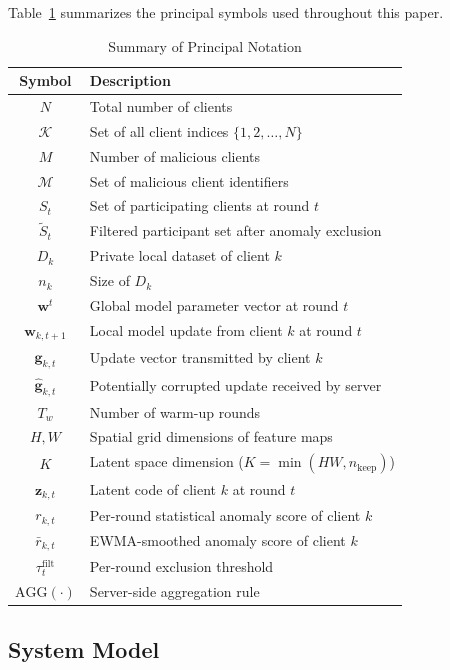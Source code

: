 \documentclass[journal]{IEEEtran}
\begin{document}
Table~\ref{tab:notation} summarizes the principal symbols used throughout this paper.

\begin{table}[t]
\centering
\caption{Summary of Principal Notation}
\label{tab:notation}
\begin{tabular}{@{}cl@{}}
\toprule
\textbf{Symbol} & \textbf{Description} \\
\midrule
$N$ & Total number of clients \\
$\mathcal{K}$ & Set of all client indices $\{1, 2, \ldots, N\}$ \\
$M$ & Number of malicious clients \\
$\mathcal{M}$ & Set of malicious client identifiers \\
$S_t$ & Set of participating clients at round $t$ \\
$\tilde{S}_t$ & Filtered participant set after anomaly exclusion \\
$D_k$ & Private local dataset of client $k$ \\
$n_k$ & Size of $D_k$ \\
$\mathbf{w}^t$ & Global model parameter vector at round $t$ \\
$\mathbf{w}_{k,t+1}$ & Local model update from client $k$ at round $t$ \\
$\mathbf{g}_{k,t}$ & Update vector transmitted by client $k$ \\
$\hat{\mathbf{g}}_{k,t}$ & Potentially corrupted update received by server \\
$T_w$ & Number of warm-up rounds \\
$H, W$ & Spatial grid dimensions of feature maps \\
$K$ & Latent space dimension ($K = \min(HW, n_{\mathrm{keep}})$) \\
$\mathbf{z}_{k,t}$ & Latent code of client $k$ at round $t$ \\
$r_{k,t}$ & Per-round statistical anomaly score of client $k$ \\
$\bar r_{k,t}$ & EWMA-smoothed anomaly score of client $k$ \\
$\tau_t^{\text{filt}}$ & Per-round exclusion threshold \\
$\text{AGG}(\cdot)$ & Server-side aggregation rule \\
\bottomrule
\end{tabular}
\end{table}

\subsection{System Model}
\end{document}
